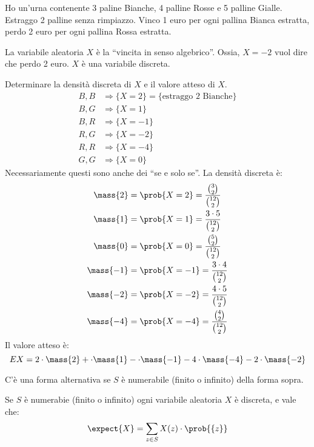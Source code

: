\begin{exmp}
Ho un'urna contenente 3 paline Bianche, 4 palline Rosse e 5 palline Gialle. Estraggo 2 palline senza rimpiazzo. Vinco 1 euro per ogni pallina Bianca estratta, perdo 2 euro per ogni pallina Rossa estratta.

La variabile aleatoria $X$ \`e la ``vincita in senso algebrico''. Ossia, $X = -2$ vuol dire che perdo 2 euro. $X$ \`e una variabile discreta.

Determinare la densit\`a discreta di $X$ e il valore atteso di $X$.
\begin{align*}
B, B &\Rightarrow \{X = 2\} = \{ \text{estraggo 2 Bianche} \} \\
B, G &\Rightarrow \{X = 1\} \\
B, R &\Rightarrow \{X = -1\} \\
R, G &\Rightarrow \{X = -2\} \\
R, R &\Rightarrow \{X = -4\} \\
G, G &\Rightarrow \{X = 0\}
\end{align*}
Necessariamente questi sono anche dei ``se e solo se''. La densit\`a discreta \`e:
\begin{align*}
\mass{2} &= \prob{X = 2} = \frac{\binom{3}{2}}{\binom{12}{2}} \\
\mass{1} &= \prob{X = 1} = \frac{3 \cdot 5}{\binom{12}{2}} \\
\mass{0} &= \prob{X = 0} = \frac{\binom{5}{2}}{\binom{12}{2}} \\
\mass{-1} &= \prob{X = -1} = \frac{3 \cdot 4}{\binom{12}{2}} \\
\mass{-2} &= \prob{X = -2} = \frac{4 \cdot 5}{\binom{12}{2}} \\
\mass{-4} &= \prob{X = -4} = \frac{\binom{4}{2}}{\binom{12}{2}}
\end{align*}
Il valore atteso \`e:
\[
EX = 2 \cdot \mass{2} + \cdot \mass{1} - \cdot \mass{-1} - 4 \cdot \mass{-4} - 2 \cdot \mass{-2}
\]
\end{exmp}
C'\`e una forma alternativa se $S$ \`e numerabile (finito o infinito) della forma sopra.
\begin{prop}
Se $S$ \`e numerabie (finito o infinito) ogni variabile aleatoria $X$ \`e discreta, e vale che:
\[
\expect{X} = \sum_{z \in S} X(z) \cdot \prob{\{z\}}
\]
\end{prop}
